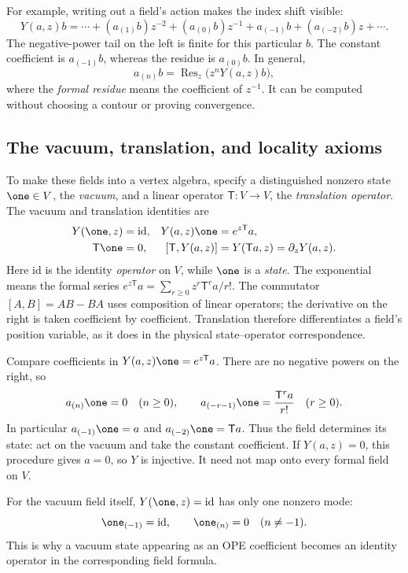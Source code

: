 For example, writing out a field's action makes the index shift visible:
\[
 Y(a,z)b=\cdots+(a_{(1)}b)z^{-2}+(a_{(0)}b)z^{-1}
                  +a_{(-1)}b+(a_{(-2)}b)z+\cdots.
\]
The negative-power tail on the left is finite for this particular
$b$. The constant coefficient is $a_{(-1)}b$, whereas the residue
is $a_{(0)}b$. In general,
\[
 a_{(n)}b=\operatorname{Res}_z\bigl(z^nY(a,z)b\bigr),
\]
where the \emph{formal residue} means the coefficient of $z^{-1}$.
It can be computed without choosing a contour or proving convergence.

\subsection{The vacuum, translation, and locality axioms}

To make these fields into a vertex algebra, specify a distinguished
nonzero state $\one\in V$, the \emph{vacuum}, and a linear
operator $\mathsf T:V\to V$, the \emph{translation operator}.
The vacuum and translation identities are
\begin{align}
 Y(\one,z)&=\mathrm{id},&
 Y(a,z)\one&=e^{z\mathsf T}a,\\
 \mathsf T\one&=0,&
 [\mathsf T,Y(a,z)]&=Y(\mathsf Ta,z)=\partial_zY(a,z).
 \label{eq:voa-vacuum-translation}
\end{align}
Here $\mathrm{id}$ is the identity \emph{operator} on $V$, while
$\one$ is a \emph{state}. The exponential means the formal series
$e^{z\mathsf T}a=\sum_{r\geq0}z^r\mathsf T^ra/r!$.
The commutator $[A,B]=AB-BA$ uses composition of linear operators;
the derivative on the right is taken coefficient by coefficient.
Translation therefore differentiates a field's position variable,
as it does in the physical state--operator correspondence.

\begin{example}
\label{ex:voa-vacuum-modes}
Compare coefficients in $Y(a,z)\one=e^{z\mathsf T}a$. There
are no negative powers on the right, so
\[
 a_{(n)}\one=0\quad(n\geq0),\qquad
 a_{(-r-1)}\one=\frac{\mathsf T^ra}{r!}\quad(r\geq0).
\]
In particular $a_{(-1)}\one=a$ and $a_{(-2)}\one=\mathsf Ta$.
Thus the field determines its state: act on the vacuum and take
the constant coefficient. If $Y(a,z)=0$, this procedure gives
$a=0$, so $Y$ is injective. It need not map onto every formal
field on $V$.

For the vacuum field itself, $Y(\one,z)=\mathrm{id}$ has only
one nonzero mode:
\[
 \one_{(-1)}=\mathrm{id},\qquad \one_{(n)}=0\quad(n\ne-1).
\]
This is why a vacuum state appearing as an OPE coefficient becomes
an identity operator in the corresponding field formula.
\end{example}

